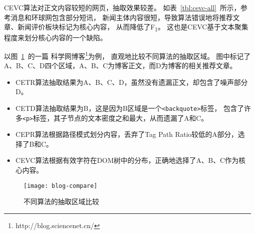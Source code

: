 CEVC算法对正文内容较短的网页，抽取效果较差。
如表~\ref{tbl:cevc-all}~所示，参考消息和环球网包含部分短讯，
新闻主体内容很短，导致算法错误地将推荐文章、新闻评价板块标记为核心内容，
从而降低了F\textsubscript{1}。
这也是CEVC基于文本聚集程度来划分核心内容的一个缺陷。

以图~\ref{fig:blog-compare}~的一篇
科学网博客\footnote{http://blog.sciencenet.cn/}为例，
直观地比较不同算法的抽取区域。
图中标记了A、B、C、D四个区域，A、B、C为博客正文，而D为博客的相关推荐文章。
\begin{itemize}
\item CETR算法抽取结果为A、B、C、D，虽然没有遗漏正文，却包含了噪声部分D。
\item CETD算法抽取结果为B，这是因为B区域是一个\texttt{<backquote>}标签，
包含了许多\texttt{<p>}标签，其子节点的文本密度之和最大，从而遗漏了A和C。
\item CEPR算法根据路径模式划分内容，丢弃了Tag Path Ratio较低的A部分，选择了B和C。
\item CEVC算法根据有效字符在DOM树中的分布，正确地选择了A、B、C作为核心内容。
\end{itemize}

\begin{figure}[htbp]
\centering
\texttt{[image: blog-compare]}
\caption{不同算法的抽取区域比较}
\label{fig:blog-compare}
\end{figure}
